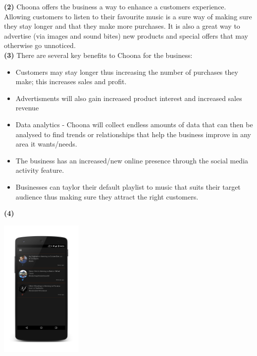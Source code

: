 \textbf{(2)} Choona offers the business a way to enhance a customers experience.  Allowing customers to listen to their favourite music is a sure way of making sure they stay longer and that they make more purchases.  It is also a great way to advertise (via images and sound bites) new products and special offers that may otherwise go unnoticed.  \\

\textbf{(3)} There are several key benefits to Choona for the business:
\begin{itemize}
\item Customers may stay longer thus increasing the number of purchases they make; this increases sales and profit.
\item Advertisments will also gain increased product interest and increased sales revenue
\item Data analytics - Choona will collect endless amounts of data that can then be analysed to find trends or relationships that help the business improve in any area it wants/needs.  
\item The business has an increased/new online presence through the social media activity feature. 
\item Businesses can taylor their default playlist to music that suits their target audience thus making sure they attract the right customers.
\end{itemize} 

\textbf{(4)}\\
\begin{minipage}{\linewidth}
\centering
\includegraphics[width=0.3\textwidth]{./img/idea_bus_prop.png}
\label{fig:image_bus_prop}
\end{minipage}\\

